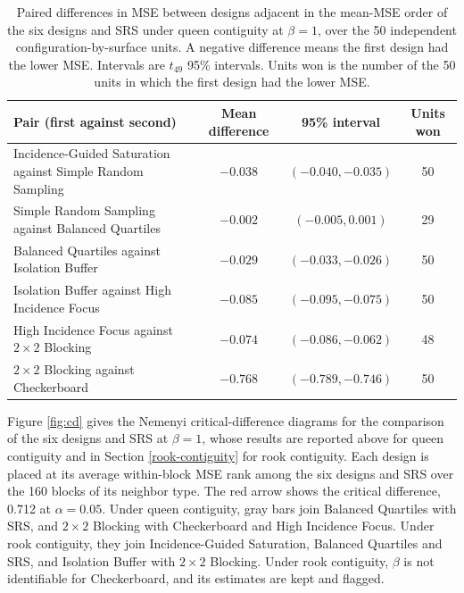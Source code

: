 \documentclass[11pt]{article}
\begin{document}
\iffullsi
\begin{table}[!htb]

\small
\centering

\caption{Paired differences in MSE between designs adjacent in the mean-MSE order of the six designs and SRS under queen contiguity at $\beta = 1$, over the 50 independent configuration-by-surface units. A negative difference means the first design had the lower MSE. Intervals are $t_{49}$ 95\% intervals. Units won is the number of the 50 units in which the first design had the lower MSE.}
\label{tab:adjacent-pairs}

\begin{tabular}{>{\raggedright\arraybackslash}p{2.6in}ccc}

\toprule
Pair (first against second) & Mean difference & 95\% interval & Units won \\

\midrule
Incidence-Guided Saturation against Simple Random Sampling & $-0.038$ & $(-0.040, -0.035)$ & 50 \\
Simple Random Sampling against Balanced Quartiles & $-0.002$ & $(-0.005, 0.001)$ & 29 \\
Balanced Quartiles against Isolation Buffer & $-0.029$ & $(-0.033, -0.026)$ & 50 \\
Isolation Buffer against High Incidence Focus & $-0.085$ & $(-0.095, -0.075)$ & 50 \\
High Incidence Focus against $2\times2$ Blocking & $-0.074$ & $(-0.086, -0.062)$ & 48 \\
$2\times2$ Blocking against Checkerboard & $-0.768$ & $(-0.789, -0.746)$ & 50 \\

\bottomrule

\end{tabular}

\end{table}
\fi

\iffullsi
Figure \ref{fig:cd} gives the Nemenyi critical-difference diagrams for
the comparison of the six designs and SRS at \(\beta = 1\), whose results are
reported above for queen contiguity and in Section \ref{rook-contiguity} for rook
contiguity. Each design is placed at its average
within-block MSE rank among the six designs and SRS over the 160 blocks of its
neighbor type. The red arrow shows the critical difference, 0.712 at
\(\alpha = 0.05\). Under queen contiguity, gray bars join Balanced Quartiles with SRS, and \(2\times2\) Blocking with
Checkerboard and High Incidence Focus. Under rook contiguity, they join
Incidence-Guided Saturation, Balanced Quartiles and SRS, and
Isolation Buffer with \(2\times2\) Blocking. Under
rook contiguity, \(\beta\) is not identifiable for Checkerboard, and its
estimates are kept and flagged.
\fi
\end{document}
